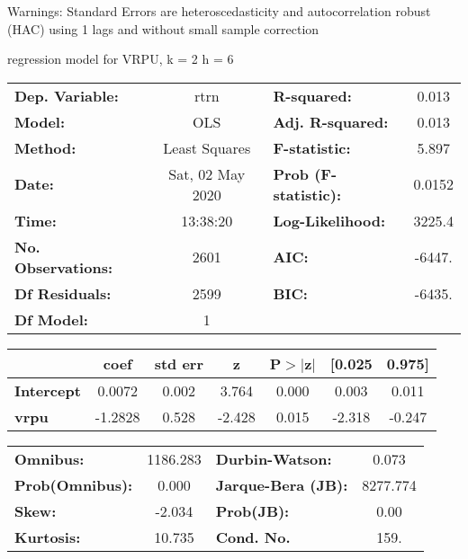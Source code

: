 Warnings: \newline
 [1] Standard Errors are heteroscedasticity and autocorrelation robust (HAC) using 1 lags and without small sample correction\ 

regression model for VRPU, k = 2 h = 6\begin{center}
\begin{tabular}{lclc}
\toprule
\textbf{Dep. Variable:}    &       rtrn       & \textbf{  R-squared:         } &     0.013   \\
\textbf{Model:}            &       OLS        & \textbf{  Adj. R-squared:    } &     0.013   \\
\textbf{Method:}           &  Least Squares   & \textbf{  F-statistic:       } &     5.897   \\
\textbf{Date:}             & Sat, 02 May 2020 & \textbf{  Prob (F-statistic):} &   0.0152    \\
\textbf{Time:}             &     13:38:20     & \textbf{  Log-Likelihood:    } &    3225.4   \\
\textbf{No. Observations:} &        2601      & \textbf{  AIC:               } &    -6447.   \\
\textbf{Df Residuals:}     &        2599      & \textbf{  BIC:               } &    -6435.   \\
\textbf{Df Model:}         &           1      & \textbf{                     } &             \\
\bottomrule
\end{tabular}
\begin{tabular}{lcccccc}
                   & \textbf{coef} & \textbf{std err} & \textbf{z} & \textbf{P$> |$z$|$} & \textbf{[0.025} & \textbf{0.975]}  \\
\midrule
\textbf{Intercept} &       0.0072  &        0.002     &     3.764  &         0.000        &        0.003    &        0.011     \\
\textbf{vrpu}      &      -1.2828  &        0.528     &    -2.428  &         0.015        &       -2.318    &       -0.247     \\
\bottomrule
\end{tabular}
\begin{tabular}{lclc}
\textbf{Omnibus:}       & 1186.283 & \textbf{  Durbin-Watson:     } &    0.073  \\
\textbf{Prob(Omnibus):} &   0.000  & \textbf{  Jarque-Bera (JB):  } & 8277.774  \\
\textbf{Skew:}          &  -2.034  & \textbf{  Prob(JB):          } &     0.00  \\
\textbf{Kurtosis:}      &  10.735  & \textbf{  Cond. No.          } &     159.  \\
\bottomrule
\end{tabular}
\end{center}

